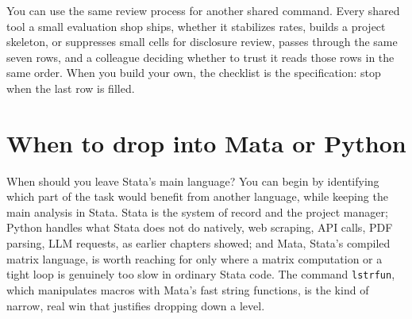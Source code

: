 \documentclass[
    a4paper,
    fontsize=10pt,
    twoside=true,
    numbers=noenddot,
]{kaobook}
\begin{document}
You can use the same review process for another shared command. Every shared tool a small evaluation shop ships, whether it stabilizes rates, builds a project skeleton, or suppresses small cells for disclosure review, passes through the same seven rows, and a colleague deciding whether to trust it reads those rows in the same order. When you build your own, the checklist is the specification: stop when the last row is filled.

\section{When to drop into Mata or Python}
When should you leave Stata's main language? You can begin by identifying which part of the task would benefit from another language, while keeping the main analysis in Stata. Stata is the system of record and the project manager; Python handles what Stata does not do natively, web scraping, API calls, PDF parsing, LLM requests, as earlier chapters showed; and Mata, Stata's compiled matrix language, is worth reaching for only where a matrix computation or a tight loop is genuinely too slow in ordinary Stata code. The command \texttt{lstrfun}, which manipulates macros with Mata's fast string functions, is the kind of narrow, real win that justifies dropping down a level.
\end{document}

